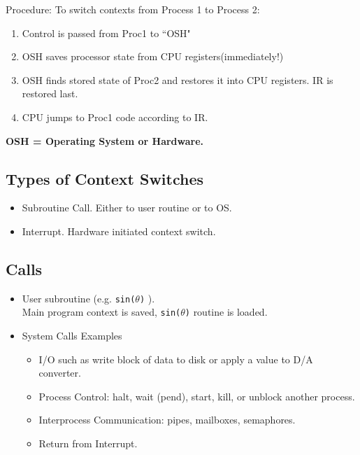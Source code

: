 \documentclass{article}	%
\begin{document}
Procedure: To switch contexts from Process 1 to Process 2:
\begin{enumerate}
\item Control is passed from Proc1 to ``OSH"
\item OSH saves processor state from CPU registers(immediately!)
\item OSH finds stored state of Proc2 and restores it
into CPU registers.  IR is restored last.
\item CPU jumps to Proc1 code according to IR.
\end{enumerate}
{\bf OSH = Operating System or Hardware.}


\subsection{Types of Context Switches}

\begin{itemize}
\item Subroutine Call. Either to user routine or to OS.
\item Interrupt.  Hardware initiated context switch.
\end{itemize}



\subsection{Calls}

\begin{itemize}
\item User subroutine (e.g. {\tt sin($\theta$)}  ).  \\
  Main program context is saved, {\tt sin($\theta$)} routine is loaded.
\item System Calls Examples
        \begin{itemize}
        \item I/O such as write block of data to disk
        or apply a value to D/A converter.
        \item Process Control:  halt, wait (pend),
        start, kill, or unblock another process.
        \item Interprocess Communication:  pipes,
        mailboxes, semaphores.
        \item Return from Interrupt.
        \end{itemize}


\end{itemize}
\end{document}
